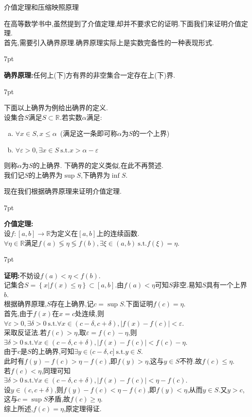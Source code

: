 \documentclass{ctexart}
\newcommand{\R}{\mathbb{R}}
\newcommand{\ep}{\varepsilon}
\newcommand{\st}{\ \text{s.t.}}
\newenvironment{formal}{%
\def\FrameCommand{%
\hspace{1pt}%
{\color{DarkBlue}\vrule width 2pt}%
{\color{formalshade}\vrule width 4pt}%
\colorbox{formalshade}%
}%
\MakeFramed{\advance\hsize-\width\FrameRestore}%
\noindent\hspace{-4.55pt}%
\begin{adjustwidth}{}{7pt}%
\vspace{2pt}\vspace{2pt}%
}
{%
\vspace{2pt}\end{adjustwidth}\endMakeFramed%
}
\newenvironment{solution}{%
\def\FrameCommand{%
\hspace{1pt}%
{\color{solutionline}\vrule width 2pt}%
{\color{solutionshade}\vrule width 4pt}%
\colorbox{solutionshade}%
}%
\MakeFramed{\advance\hsize-\width\FrameRestore}%
\noindent\hspace{-4.55pt}%
\begin{adjustwidth}{}{7pt}%
\vspace{2pt}\vspace{2pt}%
}
{%
\vspace{2pt}\end{adjustwidth}\endMakeFramed%
}
\newenvironment{theorem}{%
\def\FrameCommand{%
\hspace{1pt}%
{\color{theoremline}\vrule width 2pt}%
{\color{theoremshade}\vrule width 4pt}%
\colorbox{theoremshade}%
}%
\MakeFramed{\advance\hsize-\width\FrameRestore}%
\noindent\hspace{-4.55pt}%
\begin{adjustwidth}{}{7pt}%
\vspace{2pt}\vspace{2pt}%
}
{%
\vspace{2pt}\end{adjustwidth}\endMakeFramed%
}
\begin{document}
\pagestyle{empty}
\begin{center}\large 介值定理和压缩映照原理\end{center}
在高等数学书中,虽然提到了介值定理,却并不要求它的证明.下面我们来证明介值定理.\\
首先,需要引入确界原理.确界原理实际上是实数完备性的一种表现形式.
\begin{formal}
    \textbf{确界原理:}任何上(下)方有界的非空集合一定存在上(下)界.
\end{formal}
\begin{theorem}
    下面以上确界为例给出确界的定义.\\
    设集合$S$满足$S\subset \R$.若实数$\alpha$满足:
    \begin{enumerate}[(a)]
        \item $\forall x\in S,x\leqslant\alpha$\ (满足这一条即可称$\alpha$为$S$的一个上界)
        \item $\forall\ep>0,\exists x\in S\st x>\alpha-\ep$
    \end{enumerate}
    则称$\alpha$为$S$的上确界.
    下确界的定义类似,在此不再赘述.\\
    我们记$S$的上确界为$\sup{S}$,下确界为$\inf{S}$.
\end{theorem}\noindent
现在我们根据确界原理来证明介值定理.
\begin{formal}
    \textbf{介值定理:} \\
    设$f:[a,b]\to\mathbb{R}$为定义在$[a,b]$上的连续函数.\\
    $\forall\eta\in\R$满足$f(a)\lessgtr\eta\lessgtr f(b),\exists\xi\in(a,b)\st f(\xi)=\eta$.
\end{formal}
\begin{solution}
    \textbf{证明:}不妨设$f(a)<\eta<f(b)$.\\
    记集合$S=\left\{x|f(x)\leqslant \eta\right\}\subset[a,b].$由$f(a)<\eta$可知$S$非空.易知$S$具有一个上界$b$.\\
    根据确界原理,$S$存在上确界,记$c=\sup{S}$.下面证明$f(c)=\eta$.\\
    首先,由于$f(x)$在$x=c$处连续,则$\forall\ep>0,\exists\delta>0\st\forall x\in(c-\delta,c+\delta),\left\lvert f(x)-f(c)\right\rvert<\ep$.\\
    采取反证法.若$f(c)>\eta$,取$\ep=f(c)-\eta$,则$\exists\delta>0\st\forall x\in(c-\delta,c+\delta),\left\lvert f(x)-f(c)\right\rvert<f(c)-\eta$.\\
    由于$c$是$S$的上确界,可知$\exists y\in(c-\delta,c]\st y\in S$.\\
    此时有$f(y)-f(c)>\eta-f(c)$,即$f(y)>\eta$,这与$y\in S$不符.故$f(c)\leqslant\eta$.\\
    若$f(c)<\eta$,同理可知$\exists\delta>0\st\forall x\in(c-\delta,c+\delta),\left\lvert f(x)-f(c)\right\rvert<\eta-f(c)$.\\
    设$y\in(c,c+\delta)$,则$f(y)-f(c)<\eta-f(c)$,即$f(y)<\eta$,从而$y\in S$.又$y>c$,这与$c=\sup{S}$矛盾,故$f(c)\geqslant\eta$.\\
    综上所述,$f(c)=\eta$,原定理得证.
\end{solution}\noindent
\end{document}
